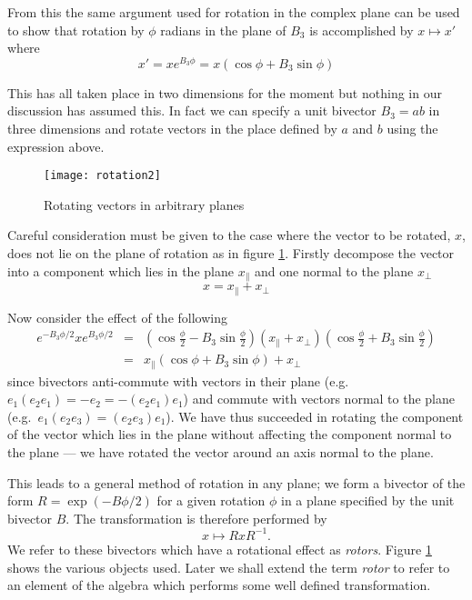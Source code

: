 From this the same argument used for rotation in the complex plane 
can be used to show that rotation by
$\phi$ radians in the plane of $B_3$ is accomplished by $x \mapsto x'$
where
\begin{displaymath}
x' = xe^{B_3\phi} = x (\cos \phi + B_3 \sin \phi)
\end{displaymath}

This has all taken place in two dimensions for the moment but nothing in our
discussion has assumed this. In fact we can specify a unit bivector $B_3 = ab$ in
three dimensions and rotate vectors in the place defined by $a$ and $b$ using
the expression above.

\begin{figure}
\centering
\texttt{[image: rotation2]}
\caption{Rotating vectors in arbitrary planes\label{fig:rotation2}}
\end{figure}

Careful consideration must be given to the case where the vector to be
rotated, $x$, does not lie on the plane of rotation as in figure
\ref{fig:rotation2}. Firstly decompose the
vector into a component which lies in the plane $x_\parallel$ and one
normal to the plane $x_\perp$
\[
x = x_\parallel + x_\perp
\]

Now consider the effect of the following
\begin{eqnarray*}
e^{-B_3\phi/2}
x
e^{B_3\phi/2}
& = & \left(\cos \frac{\phi}{2} - B_3 \sin \frac{\phi}{2}\right)
(x_\parallel + x_\perp )
\left(\cos \frac{\phi}{2} + B_3 \sin \frac{\phi}{2}\right) \\
& = & x_\parallel (\cos \phi + B_3 \sin \phi) + x_\perp
\end{eqnarray*}
since bivectors anti-commute with vectors in their plane (e.g. 
$e_1(e_2e_1) = -e_2 = -(e_2e_1)e_1$) and commute with
vectors normal to the plane (e.g.\ $e_1(e_2e_3) = (e_2e_3)e_1$).
We have thus succeeded in rotating the component of the vector 
which lies in the plane without affecting the component normal
to the plane --- we have rotated the vector around an axis normal to
the plane.

This leads to a general method of rotation in any plane; we
form a bivector of the form $R = \exp({-B\phi/2})$ for a given rotation 
$\phi$ in a plane specified by the unit bivector $B$. The transformation
is therefore performed by
\begin{displaymath}
x \mapsto RxR^{-1}.
\end{displaymath}
We refer to these bivectors which have a rotational effect as \emph{rotors}.
Figure \ref{fig:rotation2} shows the various objects used. Later we shall
extend the term \emph{rotor} to refer to an element of the algebra which
performs some well defined transformation.

